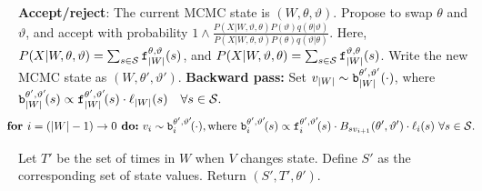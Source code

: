\begin{algorithm}
\begin{algorithmic}[1]
    \State \textbf{Accept/reject}: The current MCMC state is $(W,\theta,\vartheta)$. 
    Propose to swap $\theta$ and $\vartheta$, %
     and accept with probability 
     $
     1 \wedge \frac{P(X| W,\vartheta,\theta)P(\vartheta)q(\theta|\vartheta)}
        {P(X| W,\theta, \vartheta)P(\theta) q(\vartheta|\theta)}.
        $
        Here, $P(X|W,\theta,\vartheta) = \sum_{s \in {\mathcal S}} \mathtt{f}^{\theta,\vartheta}_{|W|}(s)$, and $P(X|W,\vartheta,\theta) = \sum_{s \in {\mathcal S}} \mathtt{f}^{\vartheta,\theta}_{|W|}(s)$.
    Write the new MCMC state as $(W,\theta',\vartheta')$.
    \State \textbf{Backward pass:}
    Set $v_{|W|} \sim \mathtt{b}^{\theta',\vartheta'}_{|W|}(\cdot)$, where $\mathtt{b}^{\theta',\vartheta'}_{|W|}\!(s) \propto \mathtt{f}^{\theta',\vartheta'}_{|W|}\!(s)\cdot\ell_{|W|}(s) \quad \forall s \in {\mathcal S}.$ 
    $$\hspace{-.15in} \textbf{for } i=(|W|-1)\rightarrow 0\textbf{ do:} \ v_i \sim \bck^{\theta',\vartheta'}_i\!(\cdot), \text{where } 
    \bck^{\theta',\vartheta'}_i\!(s) \propto \fwd^{\theta',\vartheta'}_i\!(s)\cdot B_{sv_{i+1}}(\theta',\vartheta') \cdot \ell_i(s)  \ \forall s \in \cS.$$
    
    \State Let $T'$ be the set of times in $W$ when $V$ changes state. Define $S'$ as the corresponding set of state values. Return $(S', T', \theta')$.
\end{algorithmic}
\end{algorithm}


